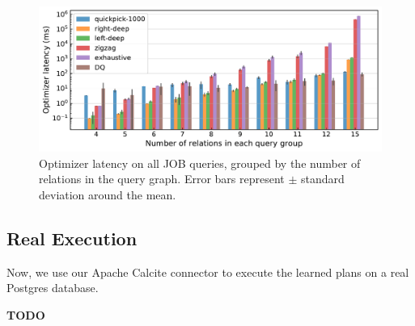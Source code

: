 \begin{figure}
    \centering
    \includegraphics[width=\columnwidth,keepaspectratio]{exp/planning-latency-grouped.pdf}
    \caption{\small{Optimizer latency on all JOB queries, grouped by the number of relations in the query graph.  Error bars represent $\pm$ standard deviation around the mean.} \label{exp:planning-latency}}
\end{figure}


\subsection{Real Execution}
Now, we use our Apache Calcite connector to execute the learned plans on a real Postgres database.  

\textbf{TODO}